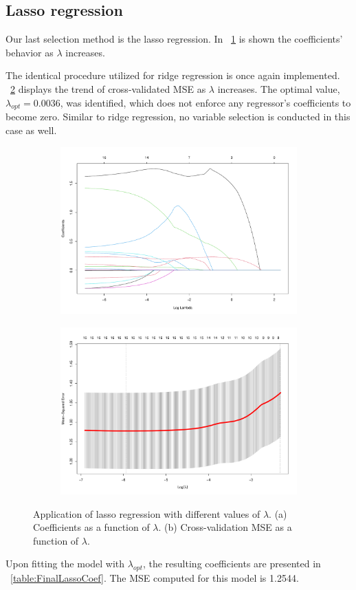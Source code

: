 \subsection{Lasso regression}

Our last selection method is the lasso regression. In \Fig~\ref{fig:LassoCoefVsLambda} is shown the coefficients' behavior as $\lambda$ increases. 

The identical procedure utilized for ridge regression is once again implemented. \Fig~\ref{fig:LassoCvPlot} displays the trend of cross-validated MSE as $\lambda$ increases. The optimal value, $\lambda_{opt} = 0.0036$, was identified, which does not enforce any regressor's coefficients to become zero. Similar to ridge regression, no variable selection is conducted in this case as well.

\begin{figure}[h]
	\centering
	\begin{subfigure}{.5\textwidth}
		\centering
		\includegraphics[width=0.7\linewidth]{ImageFiles/Regression/Lasso/LassoCoefVsLambda.pdf}
		\caption{}
		\label{fig:LassoCoefVsLambda}
	\end{subfigure}%
	\begin{subfigure}{.5\textwidth}
		\centering
		\includegraphics[width=0.7\linewidth]{ImageFiles/Regression/Lasso/LassoCvPlot.pdf}
		\caption{}
		\label{fig:LassoCvPlot}
	\end{subfigure}	
	\caption{Application of lasso regression with different values of $\lambda$. (a) Coefficients as a function of $\lambda$. (b) Cross-validation MSE as a function of $\lambda$.}
	\label{fig:FinalFSSM}
\end{figure}

Upon fitting the model with $\lambda_{opt}$, the resulting coefficients are presented in \Tab~\ref{table:FinalLassoCoef}. The MSE computed for this model is 1.2544.

